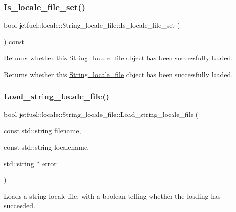 \subsubsection{\texorpdfstring{Is\+\_\+locale\+\_\+file\+\_\+set()}{Is\_locale\_file\_set()}}
{\footnotesize\ttfamily bool jetfuel\+::locale\+::\+String\+\_\+locale\+\_\+file\+::\+Is\+\_\+locale\+\_\+file\+\_\+set (\begin{DoxyParamCaption}{ }\end{DoxyParamCaption}) const\hspace{0.3cm}{\ttfamily [inline]}}



Returns whether this \hyperlink{classjetfuel_1_1locale_1_1String__locale__file}{String\+\_\+locale\+\_\+file} object has been successfully loaded. 

Returns whether this \hyperlink{classjetfuel_1_1locale_1_1String__locale__file}{String\+\_\+locale\+\_\+file} object has been successfully loaded. \mbox{\label{classjetfuel_1_1locale_1_1String__locale__file_a904609e7cde4eb624cb940cbba642ea0}} 
\subsubsection{\texorpdfstring{Load\+\_\+string\+\_\+locale\+\_\+file()}{Load\_string\_locale\_file()}\hspace{0.1cm}{\footnotesize\ttfamily [1/2]}}
{\footnotesize\ttfamily bool jetfuel\+::locale\+::\+String\+\_\+locale\+\_\+file\+::\+Load\+\_\+string\+\_\+locale\+\_\+file (\begin{DoxyParamCaption}\item[{const std\+::string}]{filename,  }\item[{const std\+::string}]{localename,  }\item[{std\+::string $\ast$}]{error }\end{DoxyParamCaption})}



Loads a string locale file, with a boolean telling whether the loading has succeeded. 

